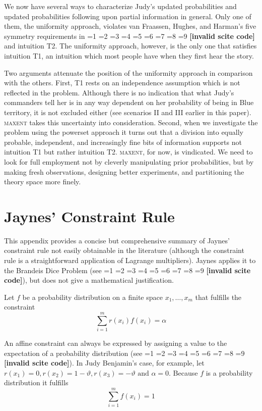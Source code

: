 \documentclass[smallextended]{svjour3}       %
\newcommand{\qvu}[0]{\vartheta}
\newcommand{\PageP}{p.~}
\newcommand{\PageP}{}
\newcommand{\scite}[3]{\ifnum#1=1\cite{#2}\else
\ifnum#1=2\cite[{\PageP}~#3]{#2}\else
\ifnum#1=3\cite[{\PageP}~#3]{#2}\else
\ifnum#1=4\cite{#2}\else
\ifnum#1=5\cite{#2}\else
\ifnum#1=6\cite[{\PageP}~#3]{#2}\else
\ifnum#1=7\cite{#2}\else
\ifnum#1=8\cite[{\PageP}~#3]{#2}\else
\ifnum#1=9\cite[{\PageP}~#3]{#2}\else
\textbf{[invalid scite code]}\fi\fi\fi\fi\fi\fi\fi\fi\fi}
\begin{document}
We now have several ways to characterize Judy's updated
probabilities and updated probabilities following upon partial
information in general. Only one of them, the uniformity approach,
violates van Fraassen, Hughes, and Harman's five symmetry requirements
in \scite{1}{fraassenetal86}{} and intuition T2. The uniformity
approach, however, is the only one that satisfies intuition T1, an
intuition which most people have when they first hear the story. 

Two arguments attenuate the position of the uniformity approach in
comparison with the others. First, T1 rests on an independence
assumption which is not reflected in the problem. Although there is no
indication that what Judy's commanders tell her is in any way
dependent on her probability of being in Blue territory, it is not
excluded either (see scenarios II and III earlier in this paper).
\textsc{maxent} takes this uncertainty into consideration. Second,
when we investigate the problem using the powerset approach it turns
out that a division into equally probable, independent, and
increasingly fine bits of information supports not intuition T1 but
rather intuition T2. \textsc{maxent}, for now, is vindicated. We need
to look for full employment not by cleverly manipulating prior
probabilities, but by making fresh observations, designing better
experiments, and partitioning the theory space more finely.

\appendix

\section{Jaynes' Constraint Rule}
\label{JaynesConstraintRule}

This appendix provides a concise but comprehensive summary of Jaynes'
constraint rule not easily obtainable in the literature (although the
constraint rule is a straightforward application of Lagrange
multipliers). Jaynes applies it to the Brandeis Dice Problem (see
\scite{8}{jaynes89}{243}), but does not give a mathematical
justification.

Let $f$ be a probability distribution on a finite space
$x_{1},\ldots,x_{m}$ that fulfills the constraint 
\begin{equation}
  \label{eq:constraint}
\sum_{i=1}^{m}r(x_{i})f(x_{i})=\alpha
\end{equation}

An affine constraint can always be expressed by assigning a value to
the expectation of a probability distribution (see
\scite{7}{hobson71}{}). In Judy Benjamin's case, for example, let
$r(x_{1})=0, r(x_{2})=1-{\qvu}, r(x_{3})=-{\qvu}\mbox{ and }\alpha=0$. Because $f$
is a probability distribution it fulfills
\begin{equation}
  \label{eq:unity}
\sum_{i=1}^{m}f(x_{i})=1
\end{equation}
\end{document}
